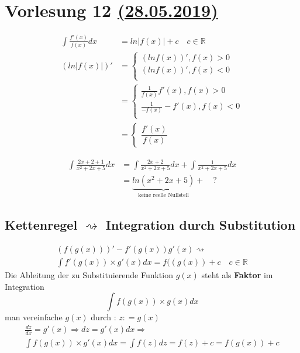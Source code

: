 \section{Vorlesung 12 \href{https://tu-dresden.de/mn/math/algebra/das-institut/beschaeftigte/antje-noack/ressourcen/dateien/v120-1/MathMethInf12.pdf?lang=en}{(28.05.2019)}}
\begin{align*}
\int \frac{f'(x)}{f(x)}dx &= ln |f(x)| + c \quad c \in \mathbb{R} \\
( ln | f(x)| )'   &= 
\begin{cases} 
(ln f(x))' , f(x)> 0 \\
(ln f(x))' , f(x)< 0 \\ 
\end{cases}\\
&=
\begin{cases}
\frac{1}{f(x)}f'(x),f(x) >0 \\
\frac{1}{-f(x)}-f'(x),f(x) < 0\\
\end{cases} \\
&= 
\begin{cases}
\dfrac{f'(x)}{f(x)}
\end{cases}
\end{align*}
\begin{example}
\begin{align*}
\int{\frac{ 2x +2 +1 }{ x^2 + 2x +5} dx }
&= \int{\frac{ 2x + 2  }{ x^2 + 2x +5} dx } + 
\int{\frac{1}{ x^2 + 2x +5} dx }\\
 &= \underbrace{ln(x^2 + 2x + 5)}_{\text{keine reelle Nullstell}}  + \quad ? 
\end{align*}
\subsection{Kettenregel $\rightsquigarrow$ Integration durch \textbf{Substitution}}
\end{example}
\begin{align*}
(f(g(x)))' - f'(g(x))g'(x) \rightsquigarrow \\
\int f'(g(x)) \times g'(x)dx = f((g(x)) + c \quad c \in \mathbb{R} 
\end{align*}
Die Ableitung der zu Substituierende Funktion $g(x)$ steht als \textbf{Faktor} im Integration
$$ \int{ f(g(x)) \times g(x) dx } $$
man vereinfache $g(x)$ durch : $z : = g(x)$
\begin{gather*}
\frac{dz}{dx} = g'(x) \Rightarrow dz = g'(x)dx \Rightarrow \\
\int{f(g(x)) \times g'(x)dx} = \int f(z)dz  = f(z) + c = f(g(x)) + c 
\end{gather*}
